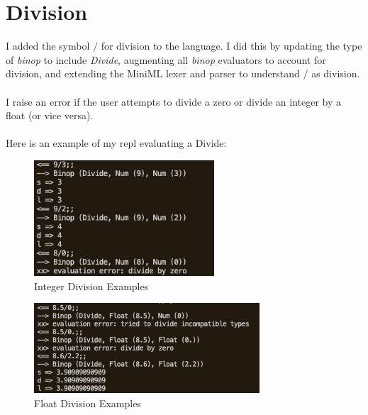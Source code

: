 \documentclass{article}
\begin{document}
\section{Division}
I added the symbol $/$ for division to the language. I did this by updating the type of \textit{binop} to include \textit{Divide}, augmenting all \textit{binop} evaluators to account for division, and extending the MiniML lexer and parser to understand $/$ as division. \\\\ I raise an error if the user attempts to divide a zero or divide an integer by a float (or vice versa).\\\\
Here is an example of my repl evaluating a Divide:\\
\begin{figure}[h]\begin{center}
    \includegraphics[width =0.6\textwidth]{divideint.png}
    \caption{Integer Division Examples}
\end{center} \end{figure}
\begin{figure}[h]\begin{center}
    \includegraphics[width =0.75\textwidth]{dividefloat.png}
    \caption{Float Division Examples}
\end{center}\end{figure}
\end{document}
